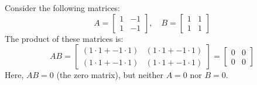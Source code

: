 \begin{eg}
    Consider the following matrices:
    \[
        A = 
        \begin{bmatrix}
            1 & -1 \\
            1 & -1
        \end{bmatrix}
        , \quad
        B = 
        \begin{bmatrix}
            1 & 1 \\
            1 & 1
        \end{bmatrix}
    \]
    The product of these matrices is:
    \[
        AB = 
        \begin{bmatrix}
            (1 \cdot 1 + -1 \cdot 1) & (1 \cdot 1 + -1 \cdot 1) \\
            (1 \cdot 1 + -1 \cdot 1) & (1 \cdot 1 + -1 \cdot 1)
        \end{bmatrix}
        =
        \begin{bmatrix}
            0 & 0 \\
            0 & 0
        \end{bmatrix}
    \]
    Here, \( AB = 0 \) (the zero matrix), but neither \( A = 0 \) nor \( B = 0 \).
\end{eg}